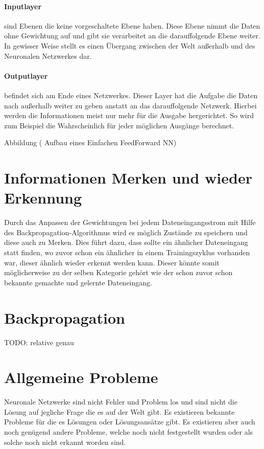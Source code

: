 \paragraph{Inputlayer} sind Ebenen die keine vorgeschaltete Ebene haben. Diese Ebene nimmt die Daten ohne Gewichtung auf und gibt sie verarbeitet an die darauffolgende Ebene weiter. In gewisser Weise stellt es einen Übergang zwischen der Welt außerhalb und des Neuronalen Netzwerkes dar.

\paragraph{Outputlayer} befindet sich am Ende eines Netzwerkes. Dieser Layer hat die Aufgabe die Daten nach außerhalb weiter zu geben anstatt an das darauffolgende Netzwerk. Hierbei werden die Informationen meist nur mehr für die Ausgabe hergerichtet. So wird zum Beispiel die Wahrscheinlich für jeder möglichen Ausgänge berechnet.

Abbildung ( Aufbau eines Einfachen FeedForward NN)

\section{Informationen Merken und wieder Erkennung}

Durch das Anpassen der Gewichtungen bei jedem Dateneingangsstrom mit Hilfe des Backpropagation-Algorithmus wird es möglich Zustände zu speichern und diese auch zu Merken. Dies führt dazu, dass sollte ein ähnlicher Dateneingang statt finden, wo zuvor schon ein ähnlicher in einem Trainingszyklus vorhanden war, dieser ähnlich wieder erkennt werden kann. Dieser könnte somit möglicherweise zu der selben Kategorie gehört wie der schon zuvor schon bekannte gemachte und gelernte Dateneingang.

\section{Backpropagation}

TODO: relative genau

\section{Allgemeine Probleme}

Neuronale Netzwerke sind nicht Fehler und Problem los und sind nicht die Lösung auf jegliche Frage die es auf der Welt gibt. Es existieren bekannte Probleme für die es Lösungen oder Lösungsansätze gibt. Es existieren aber auch noch genügend andere Probleme, welche noch nicht festgestellt wurden oder als solche noch nicht erkannt worden sind. \\

